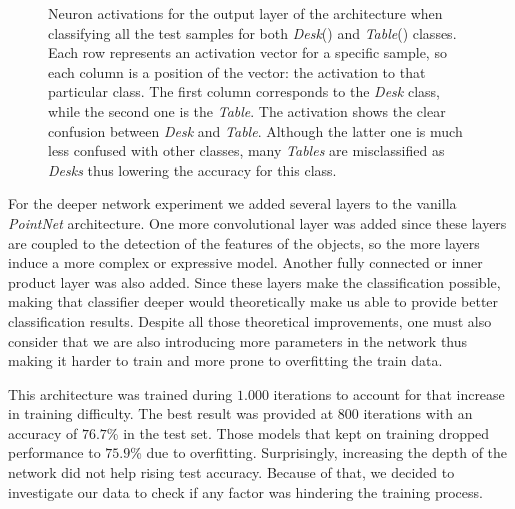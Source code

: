 \begin{figure}[!htb]
\begin{subfigure}{0.49\linewidth}
    \end{subfigure}
    \caption{Neuron activations for the output layer of the architecture when classifying all the test samples for both \emph{Desk}() and \emph{Table}() classes. Each row represents an activation vector for a specific sample, so each column is a position of the vector: the activation to that particular class. The first column corresponds to the \emph{Desk} class, while the second one is the \emph{Table}. The activation shows the clear confusion between \emph{Desk} and \emph{Table}. Although the latter one is much less confused with other classes, many \emph{Tables} are misclassified as \emph{Desks} thus lowering the accuracy for this class.}
    \label{fig:objrecog:tabledesk_activations}
\end{figure}


For the deeper network experiment we added several layers to the vanilla \emph{PointNet} architecture. One more convolutional layer was added since these layers are coupled to the detection of the features of the objects, so the more layers induce a more complex or expressive model. Another fully connected or inner product layer was also added. Since these layers make the classification possible, making that classifier deeper would theoretically make us able to provide better classification results. Despite all those theoretical improvements, one must also consider that we are also introducing more parameters in the network thus making it harder to train and more prone to overfitting the train data.

\newpage

This architecture was trained during $1.000$ iterations to account for that increase in training difficulty. The best result was provided at $800$ iterations with an accuracy of $76.7$\% in the test set. Those models that kept on training dropped performance to $75.9$\% due to overfitting. Surprisingly, increasing the depth of the network did not help rising test accuracy. Because of that, we decided to investigate our data to check if any factor was hindering the training process.

